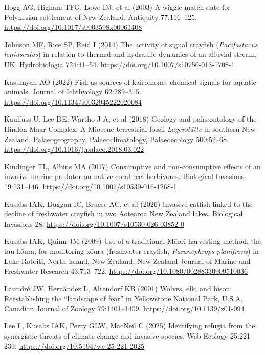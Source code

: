 \documentclass[
  letterpaper,
  DIV=11,
  numbers=noendperiod]{scrartcl}
\newlength{\cslhangindent}
\newenvironment{CSLReferences}[2] %
 {\begin{list}{}{%
  \setlength{\itemindent}{0pt}
  \setlength{\leftmargin}{0pt}
  \setlength{\parsep}{0pt}
  \ifodd #1
   \setlength{\leftmargin}{\cslhangindent}
   \setlength{\itemindent}{-1\cslhangindent}
  \fi
  \setlength{\itemsep}{#2\baselineskip}}}
 {\end{list}}
\begin{document}
\begin{CSLReferences}{1}{1}
Hogg AG, Higham TFG, Lowe DJ, et al (2003) A wiggle-match date for
{Polynesian} settlement of {New Zealand}. Antiquity 77:116--125.
\url{https://doi.org/10.1017/s0003598x00061408}

Johnson MF, Rice SP, Reid I (2014) The activity of signal crayfish
({\emph{Pacifastacus leniusculus}}) in relation to thermal and hydraulic
dynamics of an alluvial stream, {UK}. Hydrobiologia 724:41--54.
\url{https://doi.org/10.1007/s10750-013-1708-1}

Kasumyan AO (2022) Fish as sources of kairomones-chemical signals for
aquatic animals. Journal of Ichthyology 62:289--315.
\url{https://doi.org/10.1134/s0032945222020084}

Kaulfuss U, Lee DE, Wartho J-A, et al (2018) Geology and palaeontology
of the {Hindon Maar Complex}: A {Miocene} terrestrial fossil
{\emph{Lagerstätte}} in southern {New Zealand}. Palaeogeography,
Palaeoclimatology, Palaeoecology 500:52--68.
\url{https://doi.org/10.1016/j.palaeo.2018.03.022}

Kindinger TL, Albins MA (2017) Consumptive and non-consumptive effects
of an invasive marine predator on native coral-reef herbivores.
Biological Invasions 19:131--146.
\url{https://doi.org/10.1007/s10530-016-1268-1}

Kusabs IAK, Duggan IC, Bruere AC, et al (2026) Invasive catfish linked
to the decline of freshwater crayfish in two {Aotearoa New Zealand}
lakes. Biological Invasions 28:
\url{https://doi.org/10.1007/s10530-026-03852-0}

Kusabs IAK, Quinn JM (2009) Use of a traditional {Māori} harvesting
method, the tau kōura, for monitoring kōura (freshwater crayfish,
{\emph{Paranephrops planifrons}}) in {Lake Rotoiti}, {North Island},
{New Zealand}. New Zealand Journal of Marine and Freshwater Research
43:713--722. \url{https://doi.org/10.1080/00288330909510036}

Laundré JW, Hernández L, Altendorf KB (2001) Wolves, elk, and bison:
Reestablishing the {``landscape of fear''} in {Yellowstone National
Park}, {U.S.A.} Canadian Journal of Zoology 79:1401--1409.
\url{https://doi.org/10.1139/z01-094}

Lee F, Kusabs IAK, Perry GLW, MacNeil C (2025) Identifying refugia from
the synergistic threats of climate change and invasive species. Web
Ecology 25:221--239. \url{https://doi.org/10.5194/we-25-221-2025}


\end{CSLReferences}
\end{document}
